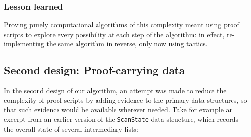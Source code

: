 \documentclass{llncs}
\newif\ifdraft\draftfalse  %
\newcommand{\comment}[3]{\ifdraft\textcolor{#1}{[#2: #3]}\else\fi}
\newcommand{\gts}[1]{\comment{OliveGreen}{GTS}{#1}}
\begin{document}
% 



\subsubsection*{Lesson learned}

Proving purely computational algorithms of this complexity meant using proof
scripts to explore every possibility at each step of the algorithm: in effect,
re-implementing the same algorithm in reverse, only now using tactics.

\subsection{Second design: Proof-carrying data}
\label{sec:depinduct}

In the second design of our algorithm, an attempt was made to reduce the
complexity of proof scripts by adding evidence to the primary data structures,
so that such evidence would be available wherever needed.  Take for example an
excerpt from an earlier version of the \texttt{ScanState} data structure,
which records the overall state of several intermediary lists:
\gts{maybe call the record type ``ScanStateV2''?}
\end{document}
